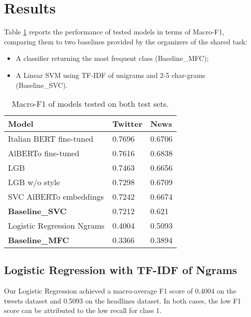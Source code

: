 \documentclass[a4paper, 9pt, twocolumn, DIV=calc]{scrartcl}
\begin{document}







\section{Results}

Table \ref{tab:models_performance} reports the performance of tested models in terms of Macro-F1, comparing them to two baselines provided by the organizers of the shared task:

\begin{itemize}
    \item A classifier returning the most frequent class (Baseline\_MFC);
    \item A Linear SVM using TF-IDF of unigrams and 2-5 char-grams (Baseline\_SVC).
\end{itemize}

\begin{table}[h]
    \centering
    \begin{tabular}{lll}
        \toprule
        Model & Twitter & News\\
        \midrule
        Italian BERT fine-tuned & 0.7696 & 0.6706\\
        AlBERTo fine-tuned & 0.7616 & 0.6838\\
        LGB & 0.7463 & 0.6656\\
        LGB w/o style & 0.7298 & 0.6709\\
        SVC AlBERTo embeddings & 0.7242 & 0.6674\\
        \textbf{Baseline\_SVC} & 0.7212 & 0.621\\
        Logistic Regression Ngrams & 0.4004 & 0.5093\\
        \textbf{Baseline\_MFC} & 0.3366 & 0.3894\\
        \bottomrule
    \end{tabular}
    \caption{Macro-F1 of models tested on both test sets.}
    \label{tab:models_performance}
\end{table}

\subsection{Logistic Regression with TF-IDF of Ngrams}

Our Logistic Regression achieved a macro-average F1 score of 0.4004 on the tweets dataset and 0.5093 on the headlines dataset. In both cases, the low F1 score can be attributed to the low recall for class 1.
\end{document}
